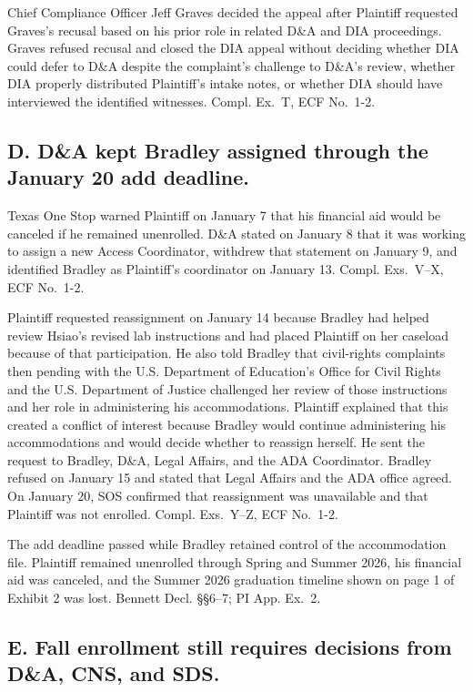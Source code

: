 \documentclass[12pt]{article}
\newcommand{\PIEx}[1]{PI App. Ex.~#1}
\newcommand{\ComplEx}[1]{Compl. Ex.~#1, ECF No.~1-2}
\newcommand{\ComplExs}[1]{Compl. Exs.~#1, ECF No.~1-2}
\begin{document}
Chief Compliance Officer Jeff Graves decided the appeal after Plaintiff requested Graves's recusal based on his prior role in related D\&A and DIA proceedings. Graves refused recusal and closed the DIA appeal without deciding whether DIA could defer to D\&A despite the complaint's challenge to D\&A's review, whether DIA properly distributed Plaintiff's intake notes, or whether DIA should have interviewed the identified witnesses. \ComplEx{T}.
 
\subsection*{D. D\&A kept Bradley assigned through the January 20 add deadline.}
 
Texas One Stop warned Plaintiff on January 7 that his financial aid would be canceled if he remained unenrolled. D\&A stated on January 8 that it was working to assign a new Access Coordinator, withdrew that statement on January 9, and identified Bradley as Plaintiff's coordinator on January 13. \ComplExs{V--X}.
 
Plaintiff requested reassignment on January 14 because Bradley had helped review Hsiao's revised lab instructions and had placed Plaintiff on her caseload because of that participation. He also told Bradley that civil-rights complaints then pending with the U.S. Department of Education's Office for Civil Rights and the U.S. Department of Justice challenged her review of those instructions and her role in administering his accommodations. Plaintiff explained that this created a conflict of interest because Bradley would continue administering his accommodations and would decide whether to reassign herself. He sent the request to Bradley, D\&A, Legal Affairs, and the ADA Coordinator. Bradley refused on January 15 and stated that Legal Affairs and the ADA office agreed. On January 20, SOS confirmed that reassignment was unavailable and that Plaintiff was not enrolled. \ComplExs{Y--Z}.
 
The add deadline passed while Bradley retained control of the accommodation file. Plaintiff remained unenrolled through Spring and Summer 2026, his financial aid was canceled, and the Summer 2026 graduation timeline shown on page 1 of Exhibit 2 was lost. Bennett Decl. \S\S 6--7; \PIEx{2}.
 
\subsection*{E. Fall enrollment still requires decisions from D\&A, CNS, and SDS.}
 
\end{document}
